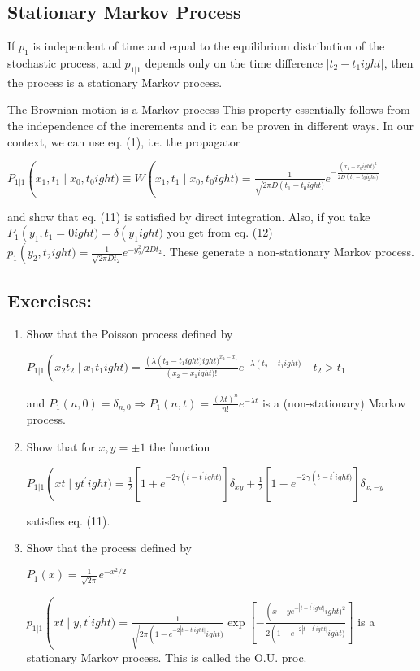 \subsection*{Stationary Markov Process}
If $p_{1}$ is independent of time and equal to the equilibrium distribution of the stochastic process, and $p_{1|1}$ depends only on the time difference $\left|t_{2}-t_{1}
ight|$, then the process is a stationary Markov process.

The Brownian motion is a Markov process
This property essentially follows from the independence of the increments and it can be proven in different ways. In our context, we can use eq. (1), i.e. the propagator
\begin{DispWithArrows}[tag=13]
    $P_{1|1}
\left(x_{1}, t_{1} 
\mid x_{0}, t_{0}
ight) \equiv W\left(x_{1}, t_{1} 
\mid x_{0}, t_{0}
ight)=\frac{1}{\sqrt{2 \pi D\left(t_{1}-t_{0}
ight)}} e^{-\frac{\left(x_{1}-x_{0}
ight)^{2}}{2D\left(t_{1}-t_{0}
ight)}}$
\end{DispWithArrows}
and show that eq. (11) is satisfied by direct integration. Also, if you take $P_{1}
\left(y_{1}, t_{1}=0
ight)=\delta\left(y_{1}
ight)$ you get from eq. (12) $p_{1}
\left(y_{2}, t_{2}
ight)=\frac{1}{\sqrt{2 \pi D t_{2}}} e^{-y_{2}^{2} / 2D t_{2}}$. These generate a non-stationary Markov process.

\subsection*{Exercises:}
\begin{enumerate}
    \item Show that the Poisson process defined by
    \begin{DispWithArrows}
        $P_{1|1}
\left(x_{2} t_{2} 
\mid x_{1} t_{1}
ight)=\frac{\left(\lambda\left(t_{2}-t_{1}
ight)
ight)^{x_{2}-x_{1}}}{\left(x_{2}-x_{1}
ight)!} e^{-\lambda\left(t_{2}-t_{1}
ight)} \quad t_{2}>t_{1}$
    \end{DispWithArrows}
    and $P_{1}(n, 0)=\delta_{n, 0} \Rightarrow P_{1}(n, t)=\frac{(\lambda t)^{n}}{n!} e^{-\lambda t}$ is a (non-stationary) Markov process.
    \item Show that for $x, y= \pm 1$ the function
    \begin{DispWithArrows}
        $P_{1|1}
\left(x t 
\mid y t^{\prime}
ight)=\frac{1}{2}
\left[1+e^{-2 \gamma\left(t-t^{\prime}
ight)}\right] \delta_{x y}+\frac{1}{2}
\left[1-e^{-2 \gamma\left(t-t^{\prime}
ight)}\right] \delta_{x,-y}$
    \end{DispWithArrows}
    satisfies eq. (11).
    \item Show that the process defined by
    \begin{DispWithArrows}
        $P_{1}(x)=\frac{1}{\sqrt{2 \pi}} e^{-x^{2} / 2}$
    \end{DispWithArrows}
    $p_{1|1}
\left(x t 
\mid y, t^{\prime}
ight)=\frac{1}{\sqrt{2 \pi\left(1-e^{-2\left|t-t^{\prime}
ight|}
ight)}} \exp
\left[-\frac{\left(x-y e^{-\left|t-t^{\prime}
ight|}
ight)^{2}}{2\left(1-e^{-2\left|t-t^{\prime}
ight|}
ight)}\right]$ is a stationary Markov process. This is called the O.U. proc.
\end{enumerate}
